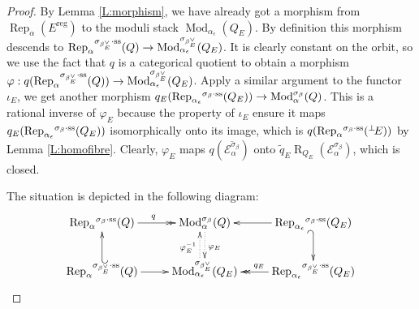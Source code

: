 \documentclass{amsart}
\theoremstyle{definition}
\theoremstyle{remark}
\numberwithin{equation}{section}
\begin{document}
\begin{proof} By Lemma \ref{L:morphism}, we have already got a morphism from ${\operatorname{Rep}}_\alpha(E^{{\operatorname{reg}}})$ to the moduli stack ${\operatorname{Mod}}_{\alpha_\epsilon}(Q_E)$.  By definition this morphism descends to ${\operatorname{Rep}}_\alpha{^{\sigma_{{\beta_E^\vee}}\cdot{\rm {ss}}}}(Q) \to{\operatorname{Mod}}_{\alpha_\epsilon}^{\sigma_{\beta_E^\vee}}(Q_E)$. It is clearly constant on the orbit, so we use the fact that $q$ is a categorical quotient to obtain a morphism $\varphi: q({\operatorname{Rep}}_\alpha{^{\sigma_{{\beta_E^\vee}}\cdot{\rm {ss}}}}(Q))\to{\operatorname{Mod}}_{\alpha_\epsilon}^{\sigma_{\beta_E^\vee}}(Q_E)$. Apply a similar argument to the functor $\iota_E$, we get another morphism $q_E( {\operatorname{Rep}}_{\alpha_\epsilon}{^{\sigma_{{\beta}}\cdot{\rm {ss}}}}(Q_E) )\to{\operatorname{Mod}}_\alpha^{\sigma_\beta}(Q)$. This is a rational inverse of $\varphi_E$ because the property of $\iota_E$ ensure it maps $q_E( {\operatorname{Rep}}_{\alpha_\epsilon}{^{\sigma_{{\beta}}\cdot{\rm {ss}}}}(Q_E))$ isomorphically onto its image, which is $q({\operatorname{Rep}}_\alpha{^{\sigma_{{\beta}}\cdot{\rm {ss}}}}({{^\perp}\!} E))$ by Lemma \ref{L:homofibre}. Clearly, $\varphi_E$ maps $q(\overline{{\mathcal{{E}}}_\alpha^{\sigma_\beta}})$ onto $\tilde{q}_E{\operatorname{R}}_{Q_E}({\mathcal{{E}}}_\alpha^{\sigma_\beta})$, which is closed.

The situation is depicted in the following diagram:$$\xymatrix @C=2.0pc {
{\operatorname{Rep}}_\alpha{^{\sigma_{{\beta}}\cdot{\rm {ss}}}}(Q) \ar@{->>}^{q}[r]  & {\operatorname{Mod}}_\alpha^{\sigma_\beta}(Q)  \ar@{.>}[d]^{\varphi_E} & \ar[l] {\operatorname{Rep}}_{\alpha_\epsilon}{^{\sigma_{{\beta}}\cdot{\rm {ss}}}}(Q_E) \ar@{_{(}->}[d] \\
{\operatorname{Rep}}_\alpha{^{\sigma_{{\beta_E^\vee}}\cdot{\rm {ss}}}}(Q) \ar[r] \ar@{_{(}->}[u]  & {\operatorname{Mod}}_{\alpha_\epsilon}^{\sigma_{\beta_E^\vee}}(Q_E)  \ar@<1ex>@{.>}[u]^{\varphi_E^{-1}} & \ar@{->>}[l]_{q_E} {\operatorname{Rep}}_{\alpha_\epsilon}{^{\sigma_{{\beta_E^\vee}}\cdot{\rm {ss}}}}(Q_E)\\
}$$
\end{proof}
\end{document}
